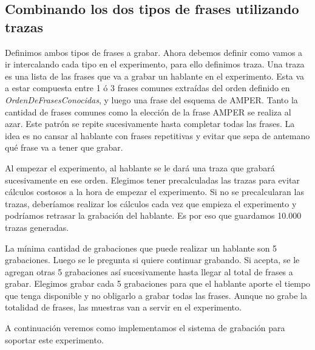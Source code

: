 \subsection{Combinando los dos tipos de frases utilizando trazas}

Definimos ambos tipos de frases a grabar. Ahora debemos definir como vamos a ir intercalando cada tipo en el experimento, para ello definimos traza. Una traza es una lista de las frases que va a grabar un hablante en el experimento. Esta va a estar compuesta entre 1 ó 3 frases comunes extraídas del orden definido en \textit{OrdenDeFrasesConocidas}, y luego una frase del esquema de AMPER. Tanto la cantidad de frases comunes como la elección de la frase AMPER se realiza al azar. Este patrón se repite sucesivamente hasta completar todas las frases. La idea es no cansar al hablante con frases repetitivas y evitar que sepa de antemano qué frase va a tener que grabar. 

Al empezar el experimento, al hablante se le dará una traza que grabará sucesivamente en ese orden. Elegimos tener precalculadas las trazas para evitar cálculos costosos a la hora de empezar el experimento. Si no se precalcularan las trazas, deberíamos realizar los cálculos cada vez que empieza el experimento y podríamos retrasar la grabación del hablante. Es por eso que guardamos 10.000 trazas generadas. 

La mínima cantidad de grabaciones que puede realizar un hablante son 5 grabaciones. Luego se le pregunta si quiere continuar grabando. Si acepta, se le agregan otras 5 grabaciones así sucesivamente hasta llegar al total de frases a grabar. Elegimos grabar cada 5 grabaciones para que el hablante aporte el tiempo que tenga disponible y no obligarlo a grabar todas las frases. Aunque no grabe la totalidad de frases, las muestras van a servir en el experimento.

A continuación veremos como implementamos el sistema de grabación para soportar este experimento.